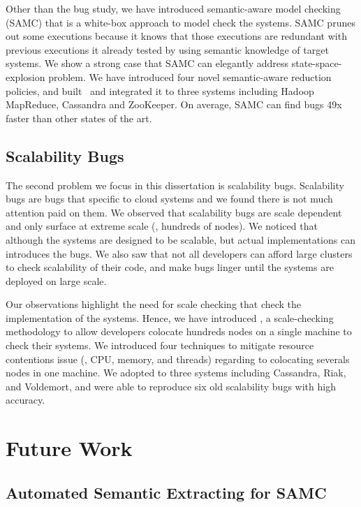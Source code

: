 Other than the bug study, we have introduced semantic-aware model checking
(SAMC) that is a white-box approach to model check the systems. SAMC prunes out
some executions because it knows that those executions are redundant with
previous executions it already tested by using semantic knowledge of target
systems. We show a strong case that SAMC can elegantly address
state-space-explosion problem. We have introduced four novel semantic-aware
reduction policies, and built \sampro\ and integrated it to three systems
including Hadoop MapReduce, Cassandra and ZooKeeper. On average, SAMC can find
bugs 49x faster than other states of the art.

\subsection{Scalability Bugs}

The second problem we focus in this dissertation is scalability bugs.
Scalability bugs are bugs that specific to cloud systems and we found there is
not much attention paid on them. We observed that scalability bugs are scale
dependent and only surface at extreme scale (\eg, hundreds of nodes). We noticed
that although the systems are designed to be scalable, but actual
implementations can introduces the bugs. We also saw that not all developers can
afford large clusters to check scalability of their code, and make bugs linger
until the systems are deployed on large scale.

Our observations highlight the need for scale checking that check the
implementation of the systems. Hence, we have introduced \sck, a scale-checking
methodology to allow developers colocate hundreds nodes on a single machine to
check their systems. We introduced four techniques to mitigate resource
contentions issue (\ie, CPU, memory, and threads) regarding to colocating
severals nodes in one machine. We adopted \sck to three systems including
Cassandra, Riak, and Voldemort, and were able to reproduce six old scalability
bugs with high accuracy.

\section{Future Work}

\subsection{Automated Semantic Extracting for SAMC}
\label{sec-autosamc}

